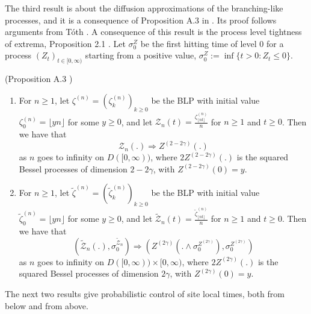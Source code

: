 \documentclass[EJP]{ejpecp} %
\begin{document}
The third result is about the diffusion approximations of the branching-like processes, and it is a consequence of Proposition A.3 in \cite{KMP23}. Its proof follows arguments from T\'{o}th \cite{T96}. A consequence of this result is the process level tightness of extrema, Proposition 2.1 \cite{KMP23}. 
Let $\sigma_0^Z$ be the first hitting time of level $0$ for a process $\left( Z_t \right) _{t \in [0,\infty )}$ starting from a positive value, $\sigma_0^Z := \inf \{t>0: Z_t \le 0\} $.
\begin{lemma}(Proposition A.3 \cite{KMP23})\label{lm: diffusion approximation of blp}
	\begin{enumerate}
		\item 
		For $n\geq 1$, let $\zeta^{(n)}=(\zeta^{(n)}_k)_{k\geq 0 }  $ be the BLP with initial value $\zeta^{(n)}_0 = \lfloor yn \rfloor$ for some $y \geq 0$, and let $\mathcal{Z}_n(t) = \frac{\zeta^{(n)}_{\lfloor nt \rfloor}}{n}$ for $n\geq 1$ and $t\geq 0$. Then we have that 
		\[
		\mathcal{Z}_n(.) \Longrightarrow Z^{(2-2\gamma)}(.)
		\] 
		as $n$ goes to infinity on $D([0,\infty))$, where $2Z^{(2-2\gamma)}(.)$ is the squared Bessel processes of dimension $2-2\gamma$, with $Z^{(2 - 2 \gamma)}(0) = y$.
		
		\item
		For $n\geq 1$, let $\tilde\zeta^{(n)}=(\tilde\zeta^{(n)}_k)_{k\geq 0 }  $ be the BLP with initial value $\tilde\zeta^{(n)}_0 = \lfloor yn \rfloor$ for some $y \geq 0$, and let $\tilde{\mathcal{Z}}_n(t) = \frac{\tilde\zeta^{(n)}_{\lfloor nt \rfloor}}{n}$ for $n\geq 1$ and $t\geq 0$. Then we have that 
		\[
		\left(\tilde{\mathcal{Z}}_n(.), \sigma_0^{\tilde{\mathcal{Z}}_n}\right) 
		\Longrightarrow \left(Z^{(2\gamma)}(. \wedge \sigma_0^{Z^{(2 \gamma)}}), \sigma_0^{Z^{(2 \gamma)}}\right)
		\]
		as $n$ goes to infinity on $D([0,\infty)) \times [0,\infty )$, where $2Z^{(2\gamma)}(.)$ is the squared Bessel processes of dimension $2\gamma$, with $Z^{( 2 \gamma)}(0) = y$.
	\end{enumerate}
	
	
\end{lemma}


The next two results give probabilistic control of site local times, both from below and from above.
\end{document}
